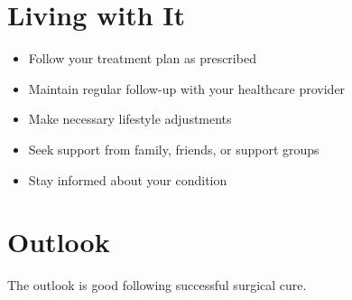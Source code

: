 \section{Living with It}
\begin{itemize}[noitemsep]
  \item Follow your treatment plan as prescribed
  \item Maintain regular follow-up with your healthcare provider
  \item Make necessary lifestyle adjustments
  \item Seek support from family, friends, or support groups
  \item Stay informed about your condition
\end{itemize}
\section{Outlook}
The outlook is good following successful surgical cure.

